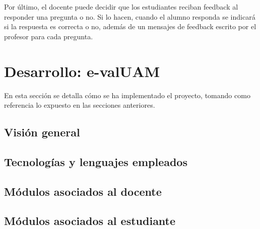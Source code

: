 Por último, el docente puede decidir que los estudiantes reciban feedback al responder una pregunta o no. Si lo hacen, cuando el alumno responda se indicará si la respuesta es correcta o no, además de un mensajes de feedback escrito por el profesor para cada pregunta.











\section{Desarrollo: e-valUAM\label{sec:desarrollo}}

En esta sección se detalla cómo se ha implementado el proyecto, tomando como referencia lo expuesto en las secciones anteriores.

\subsection{Visión general}

\subsection{Tecnologías y lenguajes empleados\label{sec:tecnologias}}

\subsection{Módulos asociados al docente}

\subsection{Módulos asociados al estudiante}

